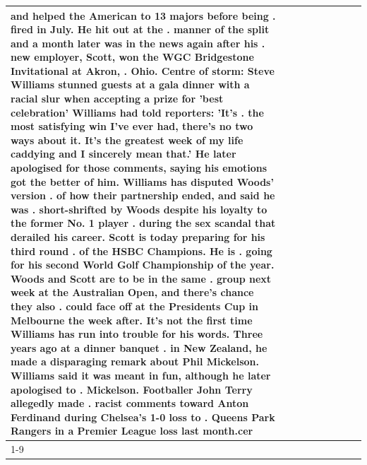 \begin{table}[H]
\begin{tabular}{lllrlllll}
and helped the American to 13 majors before being . fired in July. He hit out at the . manner of the split and a month later was in the news again after his . new employer, Scott, won the WGC Bridgestone Invitational at Akron, . Ohio. Centre of storm: Steve Williams stunned guests at a gala dinner with a racial slur when accepting a prize for 'best celebration' Williams had told reporters: 'It's . the most satisfying win I've ever had, there's no two ways about it. It's the greatest week of my life caddying and I sincerely mean that.' He later apologised for those comments, saying his emotions got the better of him. Williams has disputed Woods' version . of how their partnership ended, and said he was . short-shrifted by Woods despite his loyalty to the former No. 1 player . during the sex scandal that derailed his career. Scott is today preparing for his third round . of the HSBC Champions. He is . going for his second World Golf Championship of the year. Woods and Scott are to be in the same . group next week at the Australian Open, and there's chance they also . could face off at the Presidents Cup in Melbourne the week after. It's not the first time Williams has run into trouble for his words. Three years ago at a dinner banquet . in New Zealand, he made a disparaging remark about Phil Mickelson. Williams said it was meant in fun, although he later apologised to . Mickelson. Footballer John Terry allegedly made . racist comments toward Anton Ferdinand during Chelsea's 1-0 loss to . Queens Park Rangers in a Premier League loss last month.cer \\
\cline{1-9}

\end{tabular}
\end{table}
